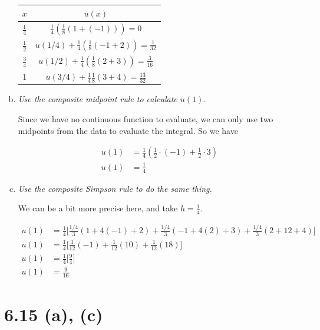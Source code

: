 \documentclass{article}
\begin{document}
\begin{enumerate}[(a)]
    \begin{table}[h!]
      \centering
      \def\arraystretch{1.5}
      \begin{tabular}{c | c}
        $x$ & $u(x)$ \\
        \hline
        $\frac{1}{4}$ & $\frac{1}{4} (\frac{1}{8}(1 + (-1))) = 0$ \\
        $\frac{1}{2}$ & $u(1/4) + \frac{1}{4}(\frac{1}{8}(-1 + 2)) = \frac{1}{32}$ \\
        $\frac{3}{4}$ & $u(1/2) + \frac{1}{4}(\frac{1}{8}(2 + 3)) = \frac{3}{16}$ \\
        1 & $u(3/4) + \frac{1}{4}\frac{1}{8}(3+4) = \frac{13}{32}$
      \end{tabular}
    \end{table}
  \item \textit{Use the composite midpoint rule to calculate $u(1)$.}

    Since we have no continuous function to evaluate, we can only use two midpoints from the data to evaluate the integral. So we have

    \begin{align*}
      u(1) &= \frac{1}{4} (\frac{1}{2}\cdot (-1) + \frac{1}{2}\cdot 3) \\
      u(1) &= \frac{1}{4}
    \end{align*}
  \item \textit{Use the composite Simpson rule to do the same thing.}
    
    We can be a bit more precise here, and take $h=\frac{1}{4}$.

    \begin{align*}
      u(1) &= \frac{1}{4}\Big[\frac{1/4}{3}(1 + 4(-1) + 2) + \frac{1/4}{3}(-1 + 4(2) + 3) + \frac{1/4}{3}(2 + 12 + 4)\Big] \\
      u(1) &= \frac{1}{4}\Big[\frac{1}{12} (-1) + \frac{1}{12} (10) + \frac{1}{12} (18)\Big] \\
      u(1) &= \frac{1}{4}\Big[\frac{9}{4}\Big] \\
      u(1) &= \frac{9}{16}
    \end{align*}
\end{enumerate}


\section*{6.15 (a), (c)}

\textit{}
\end{document}
